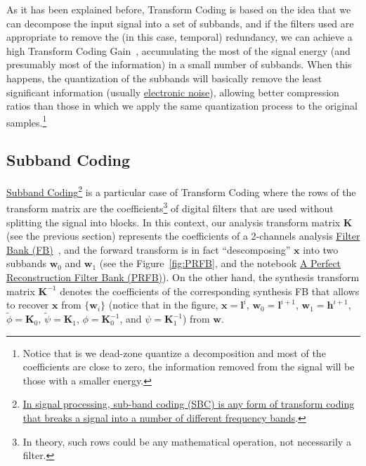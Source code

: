 As it has been explained before, Transform Coding is based on the idea
that we can decompose the input signal into a set of subbands, and if
the filters used are appropriate to remove the (in this case,
temporal) redundancy, we can achieve a high Transform Coding
Gain~\cite{sayood2017introduction}, accumulating the most of the
signal energy (and presumably most of the information) in a small
number of subbands. When this happens, the quantization of the
subbands will basically remove the least significant information
(usually
\href{https://en.wikipedia.org/wiki/Noise_(electronics)}{electronic
  noise}), allowing better compression ratios than those in which we
apply the same quantization process to the original
samples.\footnote{Notice that is we dead-zone quantize a decomposition
  and most of the coefficients are close to zero, the information
  removed from the signal will be those with a smaller energy.}


\subsection{Subband Coding}


\href{https://en.wikipedia.org/wiki/Sub-band_coding}{Subband
  Coding}\footnote{\href{https://en.wikipedia.org/wiki/Sub-band_coding}{In
    signal processing, sub-band coding (SBC) is any form of transform
    coding that breaks a signal into a number of different frequency
    bands}.} is a particular case of Transform Coding where the rows
of the transform matrix are the coefficients\footnote{In theory, such
  rows could be any mathematical operation, not necessarily a filter.}
of digital filters that are used without splitting the signal into
blocks. In this context, our analysis transform matrix ${\mathbf K}$
(see the previous section) represents the coefficients of a 2-channels
analysis \href{https://en.wikipedia.org/wiki/Filter_bank}{Filter Bank
  (FB)}~\cite{vetterli1995wavelets}, and the forward transform is in
fact ``descomposing'' ${\mathbf x}$ into two subbands ${\mathbf w}_0$
and ${\mathbf w}_1$ (see the Figure~\ref{fig:PRFB}, and the notebook
\href{https://github.com/Tecnologias-multimedia/Tecnologias-multimedia.github.io/blob/master/contents/transform_coding/PRFB.ipynb}{A
  Perfect Reconstruction Filter Bank (PRFB)}). On the other hand, the
synthesis transform matrix ${\mathbf K}^{-1}$ denotes the coefficients
of the corresponding synthesis FB that allows to recover ${\mathbf x}$
from $\{{\mathbf w}_i\}$ (notice that in the figure,
${\mathbf x}={\mathbf l}^i$, ${\mathbf w}_0={\mathbf l}^{i+1}$,
${\mathbf w}_1={\mathbf h}^{i+1}$, $\tilde\phi={\mathbf K}_0$,
$\tilde\psi={\mathbf K}_1$, $\phi={\mathbf K}^{-1}_0$, and
$\psi={\mathbf K}^{-1}_1$) from ${\mathbf w}$.

